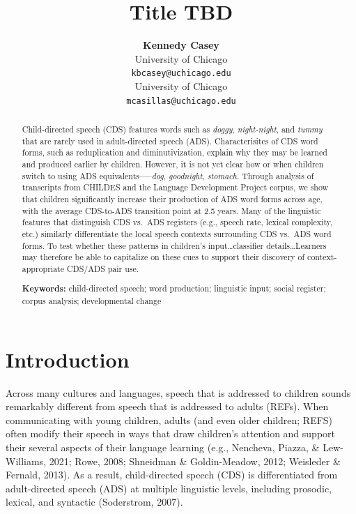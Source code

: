 \documentclass[10pt, letterpaper]{article}
\title{Title TBD}
\author{{\large \bf Kennedy Casey} \\ University of Chicago \\ \texttt{kbcasey@uchicago.edu} \And {\large \bf Marisa Casillas} \\ University of Chicago \\ \texttt{mcasillas@uchicago.edu}}
\begin{document}
\maketitle

\begin{abstract}
Child-directed speech (CDS) features words such as \emph{doggy},
\emph{night-night}, and \emph{tummy} that are rarely used in
adult-directed speech (ADS). Characterisitcs of CDS word forms, such as
reduplication and diminutivization, explain why they may be learned and
produced earlier by children. However, it is not yet clear how or when
children switch to using ADS equivalents-----\emph{dog},
\emph{goodnight}, \emph{stomach}. Through analysis of transcripts from
CHILDES and the Language Development Project corpus, we show that
children significantly increase their production of ADS word forms
across age, with the average CDS-to-ADS transition point at 2.5 years.
Many of the linguistic features that distinguish CDS vs.~ADS registers
(e.g., speech rate, lexical complexity, etc.) similarly differentiate
the local speech contexts surrounding CDS vs.~ADS word forms. To test
whether these patterns in children's input\ldots classifier
details\ldots Learners may therefore be able to capitalize on these cues
to support their discovery of context-appropriate CDS/ADS pair use.

\textbf{Keywords:}
child-directed speech; word production; linguistic input; social
register; corpus analysis; developmental change
\end{abstract}

\hypertarget{introduction}{%
\section{Introduction}\label{introduction}}

Across many cultures and languages, speech that is addressed to children
sounds remarkably different from speech that is addressed to adults
(REFs). When communicating with young children, adults (and even older
children; REFS) often modify their speech in ways that draw children's
attention and support their several aspects of their language learning
(e.g., Nencheva, Piazza, \& Lew-Williams, 2021; Rowe, 2008; Shneidman \&
Goldin-Meadow, 2012; Weisleder \& Fernald, 2013). As a result,
child-directed speech (CDS) is differentiated from adult-directed speech
(ADS) at multiple linguistic levels, including prosodic, lexical, and
syntactic (Soderstrom, 2007).
\end{document}

